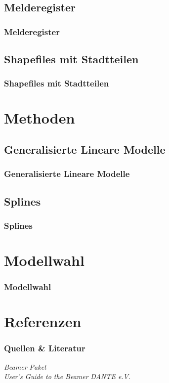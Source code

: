 \documentclass{beamer}
\begin{document}
\subsection{Melderegister}
\begin{frame}\frametitle{Melderegister}

\end{frame}

\subsection{Shapefiles mit Stadtteilen}
\begin{frame}\frametitle{Shapefiles mit Stadtteilen}

\end{frame}

\section{Methoden} 
\subsection{Generalisierte Lineare Modelle}
\begin{frame}
\frametitle{Generalisierte Lineare Modelle}

\end{frame}

\subsection{Splines}
\begin{frame}
\frametitle{Splines}

\end{frame}


\section{Modellwahl}
\begin{frame}\frametitle{Modellwahl}

\end{frame}

\section[Quellen]{Referenzen}
\begin{frame}\frametitle{Quellen \& Literatur}

\begin{thebibliography}{9}
 \emph{Beamer Paket} \\ 
 \emph{User's Guide to the Beamer} 
 \emph{DANTE e.V.}    
\end{thebibliography}


\end{frame}
\end{document}
